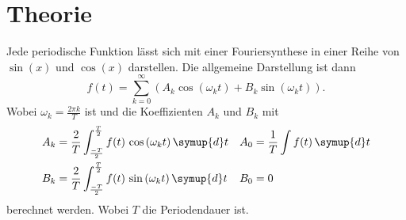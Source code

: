 \section{Theorie}
\label{sec:Theorie}

Jede periodische Funktion lässt sich mit einer Fouriersynthese in einer Reihe von $\sin(x)$ und $\cos(x)$ darstellen. Die allgemeine Darstellung ist dann 
\begin{equation}
    \label{eq:Fouriersynthese}
    f (t) = \sum_{k=0}^\infty \left(A_k \cos \left( \omega _k t \right) + B_k \sin \left( \omega _k t \right) \right).
\end{equation}
Wobei $\omega _k = \frac {2 \pi k}{T}$ ist und die Koeffizienten $A_k$ und $B_k$ mit 
\begin{align}
    A_k &= \frac{2}{T} \int_{\frac{-T}{2}}^{\frac{T}{2}} f(t) \, \cos \left( \omega _k t \right)  \symup{d}t & A_0 &= \frac{1}{T} \int f (t) \, \symup{d}t \label{eq:A_k} \\
    B_k &= \frac{2}{T} \int_{\frac{-T}{2}}^{\frac{T}{2}} f(t) \, \sin \left( \omega _k t \right)  \symup{d}t & B_0 &= 0 \label{eq:B_k}
\end{align}
berechnet werden. Wobei $T$ die Periodendauer ist. \cite{V802}